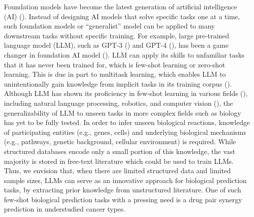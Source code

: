 {Foundation models have become the latest generation of artificial intelligence (AI) (\cite{Moor2023-dp}). Instead of designing AI models that solve specific tasks one at a time, such foundation models or ``generalist'' model can be applied to many downstream tasks without specific training. For example,  large pre-trained language model (LLM), such as GPT-3 (\cite{brown_language_2020}) and GPT-4 (\cite{OpenAI2023-ce}), has been a game changer in foundation AI model (\cite{Mitchell2023-cs}). LLM can apply its skills to unfamiliar tasks that it has never been trained for, which is few-shot learning or zero-shot learning. This is due in part to multitask learning, which enables LLM to unintentionally gain knowledge from implicit tasks in its training corpus (\cite{radford_language_nodate}). Although LLM has shown its proficiency in few-shot learning in various fields (\cite{brown_language_2020}), including natural language processing, robotics, and computer vision (\cite{veit_learning_2017, brown_language_2020, wertheimer_few-shot_2019}), the generalizability of LLM to unseen tasks in more complex fields such as biology has yet to be fully tested. In order to infer unseen biological reactions, knowledge of participating entities (e.g., genes, cells) and underlying biological mechanisms (e.g., pathways, genetic background, cellular environment) is required. While structured databases encode only a small portion of this knowledge, the vast majority is stored in free-text literature which could be used to train LLMs. Thus, we envision that, when there are limited structured data and limited sample sizes, LLMs can serve as an innovative approach for biological prediction tasks, by extracting prior knowledge from unstructured literature. One of such few-shot biological prediction tasks with a pressing need is a drug pair synergy prediction in understudied cancer types.  

}
